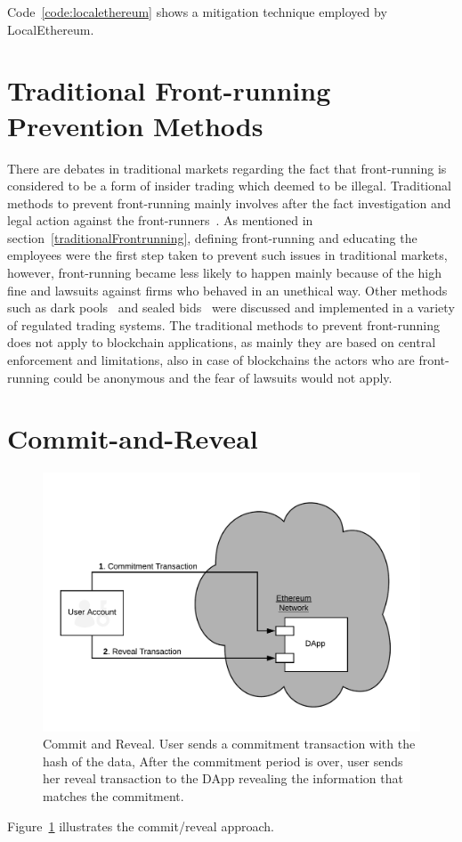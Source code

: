 \documentclass[envcountsect]{llncs}
\begin{document}
Code~\ref{code:localethereum} shows a mitigation technique employed by LocalEthereum. \\



\section{Traditional Front-running Prevention Methods}

There are debates in traditional markets regarding the fact that front-running is considered to be a form of insider trading which deemed to be illegal. Traditional methods to prevent front-running mainly involves after the fact investigation and legal action against the front-runners~\cite{LexisNexisLawSuit}. As mentioned in section~\ref{traditionalFrontrunning}, defining front-running and educating the employees were the first step taken to prevent such issues in traditional markets, however, front-running became less likely to happen mainly because of the high fine and lawsuits against firms who behaved in an unethical way. Other methods such as dark pools~\cite{zhu2014dark, buti2011diving} and sealed bids~\cite{radner1989sealed} were discussed and implemented in a variety of regulated trading systems. The traditional methods to prevent front-running does not apply to blockchain applications, as mainly they are based on central enforcement and limitations, also in case of blockchains the actors who are front-running could be anonymous and the fear of lawsuits would not apply. 


\section{Commit-and-Reveal} \label{app:cr}

\begin{figure}[!htb]
\centering
\includegraphics[width=0.5\linewidth]{figures/commit-reveal.png}
\caption{\scriptsize Commit and Reveal. User sends a commitment transaction with the hash of the data, After the commitment period is over, user sends her reveal transaction to the DApp revealing the information that matches the commitment. \label{fig:commitReveal}}
\end{figure}

Figure~\ref{fig:commitReveal} illustrates the commit/reveal approach.
\end{document}
